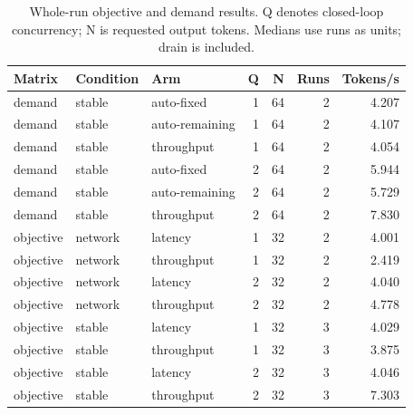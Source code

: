 \begin{table}[htbp]
\centering\small
\caption{Whole-run objective and demand results. Q denotes closed-loop concurrency; N is requested output tokens. Medians use runs as units; drain is included.}
\begin{tabular}{lllrrrr}
\toprule
Matrix & Condition & Arm & Q & N & Runs & Tokens/s \\
\midrule
demand & stable & auto-fixed & 1 & 64 & 2 & 4.207 \\
demand & stable & auto-remaining & 1 & 64 & 2 & 4.107 \\
demand & stable & throughput & 1 & 64 & 2 & 4.054 \\
demand & stable & auto-fixed & 2 & 64 & 2 & 5.944 \\
demand & stable & auto-remaining & 2 & 64 & 2 & 5.729 \\
demand & stable & throughput & 2 & 64 & 2 & 7.830 \\
objective & network & latency & 1 & 32 & 2 & 4.001 \\
objective & network & throughput & 1 & 32 & 2 & 2.419 \\
objective & network & latency & 2 & 32 & 2 & 4.040 \\
objective & network & throughput & 2 & 32 & 2 & 4.778 \\
objective & stable & latency & 1 & 32 & 3 & 4.029 \\
objective & stable & throughput & 1 & 32 & 3 & 3.875 \\
objective & stable & latency & 2 & 32 & 3 & 4.046 \\
objective & stable & throughput & 2 & 32 & 3 & 7.303 \\
\bottomrule
\end{tabular}
\end{table}
